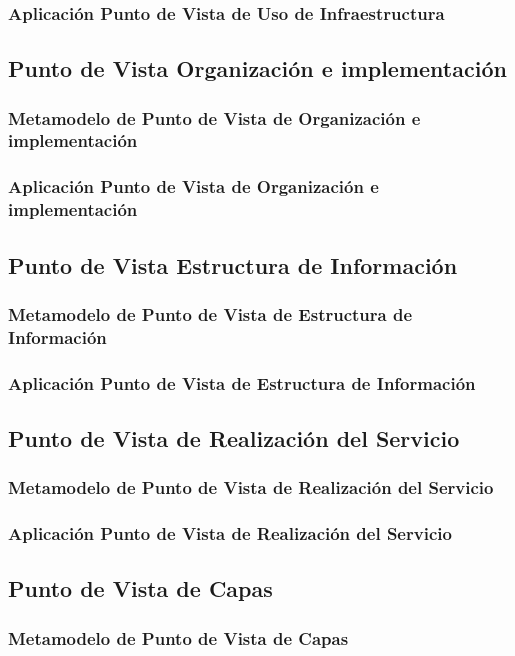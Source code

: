       \subsubsection{Aplicación Punto de Vista de Uso de Infraestructura}
      \subsection{Punto de Vista Organización e implementación}
      \subsubsection{Metamodelo de Punto de Vista de Organización e implementación}
      \subsubsection{Aplicación Punto de Vista de Organización e implementación}
      \subsection{Punto de Vista Estructura de Información}
      \subsubsection{Metamodelo de Punto de Vista de Estructura de Información}
      \subsubsection{Aplicación Punto de Vista de Estructura de Información}
      \subsection{Punto de Vista de Realización del Servicio}
      \subsubsection{Metamodelo de Punto de Vista de Realización del Servicio}
      \subsubsection{Aplicación Punto de Vista de Realización del Servicio}
      \subsection{Punto de Vista de Capas}
      \subsubsection{Metamodelo de Punto de Vista de Capas}
